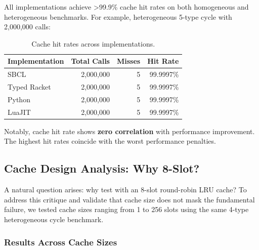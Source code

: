 \documentclass[sigplan,final]{acmart}
\begin{document}
All implementations achieve >99.9\% cache hit rates on both homogeneous and heterogeneous
benchmarks. For example, heterogeneous 5-type cycle with 2,000,000 calls:

\begin{table}[h]
\centering
\caption{Cache hit rates across implementations.}
\label{tab:hit-rates}
\begin{tabular}{@{}lrrr@{}}
\toprule
\textbf{Implementation} & \textbf{Total Calls} & \textbf{Misses} & \textbf{Hit Rate} \\
\midrule
SBCL & 2,000,000 & 5 & 99.9997\% \\
Typed Racket & 2,000,000 & 5 & 99.9997\% \\
Python & 2,000,000 & 5 & 99.9997\% \\
LuaJIT & 2,000,000 & 5 & 99.9997\% \\
\bottomrule
\end{tabular}
\end{table}

Notably, cache hit rate shows \textbf{zero correlation} with performance improvement. The
highest hit rates coincide with the worst performance penalties.

\subsection{Cache Design Analysis: Why 8-Slot?}
\label{sec:cache-design}

A natural question arises: why test with an 8-slot round-robin LRU cache? To address this critique
and validate that cache size does not mask the fundamental failure, we tested cache sizes ranging
from 1 to 256 slots using the same 4-type heterogeneous cycle benchmark.

\subsubsection{Results Across Cache Sizes}
\end{document}
